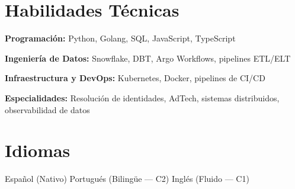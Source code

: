 \documentclass[10pt,a4paper]{article}
\begin{document}
\section*{Habilidades Técnicas}

\textbf{Programación:} Python, Golang, SQL, JavaScript, TypeScript

\textbf{Ingeniería de Datos:} Snowflake, DBT, Argo Workflows, pipelines ETL/ELT

\textbf{Infraestructura y DevOps:} Kubernetes, Docker, pipelines de CI/CD

\textbf{Especialidades:} Resolución de identidades, AdTech, sistemas distribuidos,
observabilidad de datos

\section*{Idiomas}

Español (Nativo)
\quad\textperiodcentered\quad Portugués (Bilingüe --- C2)
\quad\textperiodcentered\quad Inglés (Fluido --- C1)
\end{document}

